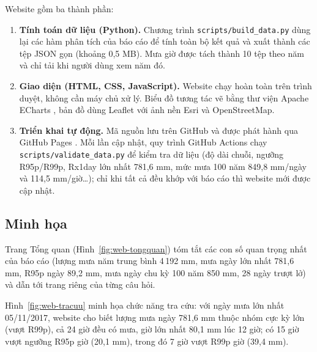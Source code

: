 Website gồm ba thành phần:

\begin{enumerate}[label=(\arabic*), leftmargin=1.2cm]
  \item \textbf{Tính toán dữ liệu (Python).} Chương trình \texttt{scripts/build\_data.py} dùng lại các hàm phân tích của báo cáo để tính toàn bộ kết quả và xuất thành các tệp JSON gọn (khoảng 0,5 MB). Mưa giờ được tách thành 10 tệp theo năm và chỉ tải khi người dùng xem năm đó.
  \item \textbf{Giao diện (HTML, CSS, JavaScript).} Website chạy hoàn toàn trên trình duyệt, không cần máy chủ xử lý. Biểu đồ tương tác vẽ bằng thư viện Apache ECharts \cite{echarts}, bản đồ dùng Leaflet \cite{leaflet} với ảnh nền Esri và OpenStreetMap.
  \item \textbf{Triển khai tự động.} Mã nguồn lưu trên GitHub và được phát hành qua GitHub Pages \cite{ghpages}. Mỗi lần cập nhật, quy trình GitHub Actions chạy \texttt{scripts/validate\_data.py} để kiểm tra dữ liệu (độ dài chuỗi, ngưỡng R95p/R99p, Rx1day lớn nhất 781,6 mm, mức mưa 100 năm 849,8 mm/ngày và 114,5 mm/giờ…); chỉ khi tất cả đều khớp với báo cáo thì website mới được cập nhật.
\end{enumerate}

\subsection{Minh họa}


Trang Tổng quan (Hình~\ref{fig:web-tongquan}) tóm tắt các con số quan trọng nhất của báo cáo (lượng mưa năm trung bình 4\,192 mm, mưa ngày lớn nhất 781,6 mm, R95p ngày 89,2 mm, mưa ngày chu kỳ 100 năm 850 mm, 28 ngày trượt lở) và dẫn tới trang riêng của từng câu hỏi.


Hình~\ref{fig:web-tracuu} minh họa chức năng tra cứu: với ngày mưa lớn nhất 05/11/2017, website cho biết lượng mưa ngày 781,6 mm thuộc nhóm cực kỳ lớn (vượt R99p), cả 24 giờ đều có mưa, giờ lớn nhất 80,1 mm lúc 12 giờ; có 15 giờ vượt ngưỡng R95p giờ (20,1 mm), trong đó 7 giờ vượt R99p giờ (39,4 mm).

